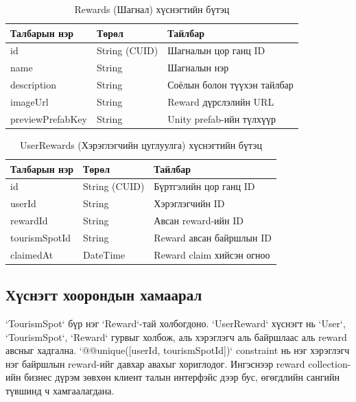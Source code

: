 \begin{sloppy}
\begin{table}[H]
    \centering
    \caption{Rewards (Шагнал) хүснэгтийн бүтэц}
    \label{tab:rewards_table}
    \begin{tabular}{|l|l|l|}
        \hline
        \textbf{Талбарын нэр} & \textbf{Төрөл} & \textbf{Тайлбар} \\ \hline
        id & String (CUID) & Шагналын цор ганц ID \\ \hline
        name & String & Шагналын нэр \\ \hline
        description & String & Соёлын болон түүхэн тайлбар \\ \hline
        imageUrl & String & Reward дүрслэлийн URL \\ \hline
        previewPrefabKey & String & Unity prefab-ийн түлхүүр \\ \hline
    \end{tabular}
\end{table}

\begin{table}[H]
    \centering
    \caption{UserRewards (Хэрэглэгчийн цуглуулга) хүснэгтийн бүтэц}
    \label{tab:user_rewards_table}
    \begin{tabular}{|l|l|l|}
        \hline
        \textbf{Талбарын нэр} & \textbf{Төрөл} & \textbf{Тайлбар} \\ \hline
        id & String (CUID) & Бүртгэлийн цор ганц ID \\ \hline
        userId & String & Хэрэглэгчийн ID \\ \hline
        rewardId & String & Авсан reward-ийн ID \\ \hline
        tourismSpotId & String & Reward авсан байршлын ID \\ \hline
        claimedAt & DateTime & Reward claim хийсэн огноо \\ \hline
    \end{tabular}
\end{table}

\subsection{Хүснэгт хоорондын хамаарал}

`TourismSpot` бүр нэг `Reward`-тай холбогдоно. `UserReward` хүснэгт нь `User`, `TourismSpot`, `Reward` гурвыг холбож, аль хэрэглэгч аль байршлаас аль reward авсныг хадгална. `@@unique([userId, tourismSpotId])` constraint нь нэг хэрэглэгч нэг байршлын reward-ийг давхар авахыг хориглодог. Ингэснээр reward collection-ийн бизнес дүрэм зөвхөн клиент талын интерфэйс дээр бус, өгөгдлийн сангийн түвшинд ч хамгаалагдана.

\end{sloppy}
